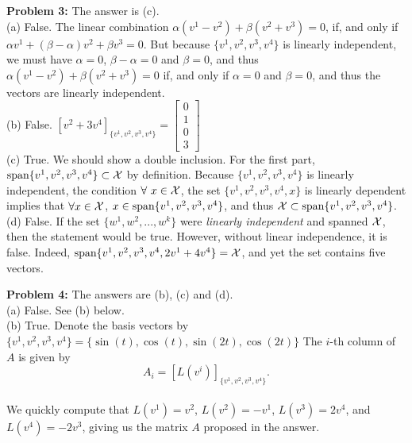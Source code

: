 \documentclass[letterpaper]{article}
\begin{document}
\bigskip

\noindent \textbf{Problem 3:} The answer is (c). \\

(a) False. The linear combination $\alpha (v^1-v^2) + \beta(v^2+v^3)=0$, if, and only if  $\alpha v^1+(\beta-\alpha)v^2 + \beta v^3=0$. But because $\{ v^1, v^2, v^3, v^4\}$  is linearly independent, we must have $\alpha=0$, $\beta-\alpha=0$ and $\beta=0$, and thus $\alpha (v^1-v^2) + \beta(v^2+v^3)=0$ if, and only if $\alpha=0$ and $\beta=0$, and thus the vectors are linearly independent. \\


(b) False. $\left[ v^2 + 3 v^4 \right]_{\{ v^1, v^2, v^3, v^4 \}} = \left[ \begin{array}{c} 0\\1\\0\\3\end{array} \right]$  \\

(c) True. We should show a double inclusion. For the first part, $\textrm{span} \{  v^1, v^2, v^3, v^4 \} \subset {\cal X}$ by definition. Because $\{ v^1, v^2, v^3, v^4\}$ is linearly independent, the condition $\forall~x \in {\cal X}$, the set $\{ v^1, v^2, v^3, v^4, x\}$ is linearly dependent implies that $\forall x\in{\cal X}$, $x \in  \textrm{span} \{  v^1, v^2, v^3, v^4 \}$, and thus ${\cal X} \subset \textrm{span} \{  v^1, v^2, v^3, v^4 \} $.\\

(d) False.  If the set $\{ w^1, w^2,...,w^k\}$ were \textit{linearly independent} and spanned ${\cal X}$, then the statement would be true. However, without linear independence, it is false. Indeed, $\textrm{span} \{  v^1, v^2, v^3, v^4, 2v^1+4v^4 \} = {\cal X}$, and yet the set contains five vectors.

\newpage

\noindent \textbf{Problem 4:} The answers are (b), (c) and (d). \\

(a) False. See (b) below.\\

(b) True. Denote the basis vectors by $\{ v^1, v^2, v^3, v^4\}= \{\sin(t), \cos(t), \sin(2t), \cos(2t)\}$ The $i$-th column of $A$ is given by $$A_i=[L(v^i)]_{\{ v^1, v^2, v^3, v^4\}}.$$\\
We quickly compute that $L(v^1)=v^2$,   $L(v^2)=-v^1$,  $L(v^3)=2v^4$,  and $L(v^4)=-2v^3$, giving us the matrix $A$ proposed in the answer. \\
\end{document}
